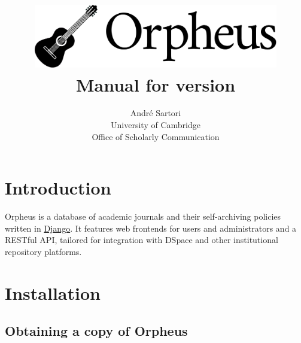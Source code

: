 \documentclass[british, 12pt]{article}
\begin{document}
\title{\includegraphics[width=0.8\textwidth]{orpheus-logo-final}\\
  \large Manual for version \orpheusversion\\[1mm]
}
\author{André Sartori\\
  \normalsize University of Cambridge\\[-1mm]
  \normalsize Office of Scholarly Communication}
\maketitle
\tableofcontents{}

\section{Introduction}

Orpheus is a database of academic journals and their self-archiving policies written in \href{https://www.djangoproject.com}{Django}. It features web frontends for users and administrators and a RESTful API, tailored for integration with DSpace and other institutional repository platforms.

\section{Installation}

\lstset{language=bash}

\subsection{Obtaining a copy of Orpheus}
\end{document}
